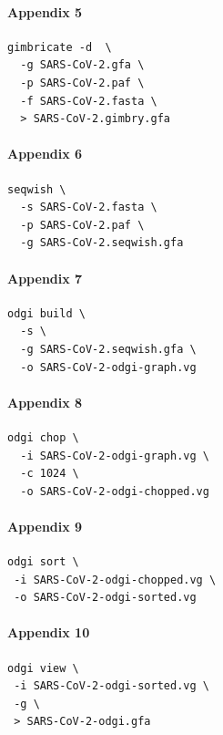 \documentclass[10pt, a4paper]{article}
\begin{document}
\begin{appendices}
\paragraph{Appendix 5}
\label{sec:org429ca68}
\begin{verbatim}
gimbricate -d  \
  -g SARS-CoV-2.gfa \
  -p SARS-CoV-2.paf \
  -f SARS-CoV-2.fasta \
  > SARS-CoV-2.gimbry.gfa

\end{verbatim}

\paragraph{Appendix 6}
\label{sec:org6fbca75}
\begin{verbatim}
seqwish \
  -s SARS-CoV-2.fasta \
  -p SARS-CoV-2.paf \
  -g SARS-CoV-2.seqwish.gfa
\end{verbatim}


\paragraph{Appendix 7}
\label{sec:orgf8f7add}
\begin{verbatim}
odgi build \
  -s \
  -g SARS-CoV-2.seqwish.gfa \
  -o SARS-CoV-2-odgi-graph.vg
\end{verbatim}


\paragraph{Appendix 8}
\label{sec:orgd4dbcad}
\begin{verbatim}
odgi chop \
  -i SARS-CoV-2-odgi-graph.vg \
  -c 1024 \
  -o SARS-CoV-2-odgi-chopped.vg
\end{verbatim}

\paragraph{Appendix 9}
\label{sec:orgca0e93f}
\begin{verbatim}
odgi sort \
 -i SARS-CoV-2-odgi-chopped.vg \
 -o SARS-CoV-2-odgi-sorted.vg
\end{verbatim}

\paragraph{Appendix 10}
\label{sec:org95595c2}
\begin{verbatim}
odgi view \
 -i SARS-CoV-2-odgi-sorted.vg \
 -g \
 > SARS-CoV-2-odgi.gfa
\end{verbatim}


\end{appendices}
\end{document}
